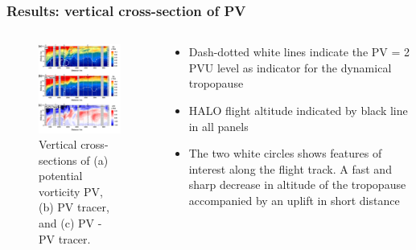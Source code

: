 \documentclass[18pt]{beamer}
\begin{document}
	\begin{frame}
	\frametitle{Results: vertical cross-section of PV}
	
		\begin{columns}
			\begin{block}{}
				\begin{figure}
					\centering
					\includegraphics[width=5cm]{../figs/cross-section.png}
					\caption{\footnotesize {Vertical cross-sections of (a) potential vorticity PV, (b) PV tracer, and (c) PV - PV tracer. }
					}
				\end{figure}
			\end{block}
			\column{.5\textwidth}
			\begin{block}{}
				\begin{itemize}
					\item \small{Dash-dotted white lines indicate the PV = 2 PVU level as indicator for the dynamical tropopause}
					\item \small{HALO flight altitude indicated by black line in all panels}
					\item \small{The two white circles shows features of interest along the flight track. A fast and sharp decrease in altitude of the tropopause accompanied by an uplift in short distance}
				\end{itemize}
			\end{block}
		\end{columns}
	\end{frame}
\end{document}
